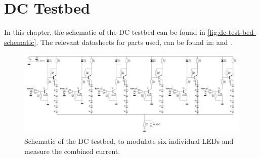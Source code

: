
\chapter{DC Testbed}
\label{app:dc-test-bed}

In this chapter, the schematic of the DC testbed can be found in \autoref{fig:dc-test-bed-schematic}.
The relevant datasheets for parts used, can be found in: \cite{2n3904-npn-transistor-datasheet} and \cite{bc556-pnp-transistor-datasheet}.


\begin{figure}
	\includegraphics[angle=90,width=\textwidth,height=.9\textheight,keepaspectratio]{chapters/appendix/dc-test-bed/dc-test-bed-schematic.jpg}
	\caption{Schematic of the DC testbed, to modulate six individual LEDs and measure the combined current.}
	\label{fig:dc-test-bed-schematic}
\end{figure}


